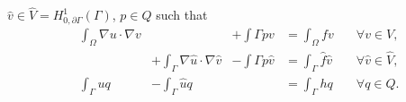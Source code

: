 \documentclass[r]{siamart171218}
\begin{document}
$\hat{v}\in\hat{V}=H^1_{0, \partial\Gamma}(\Gamma)$, $p\in Q$ such that
%
\begin{equation}\label{eq:coupled_weak}
  \begin{aligned}
    &\int_{\Omega}\nabla u\cdot \nabla v &\phantom{+\int_{\Gamma}\nabla \hat{u}\cdot \nabla \hat{v}} &+\int{\Gamma}p v &= \int_{\Omega}f v \quad &\forall v\in V,\\
    &\phantom{\int_{\Omega}\nabla u\cdot \nabla v} &+{\int_{\Gamma}\nabla \hat{u}\cdot \nabla \hat{v}} &-\int{\Gamma}p\hat{v} &= \int_{\Gamma}\hat{f}\hat{v} \quad &\forall \hat{v}\in \hat{V},\\
    &\int_{\Gamma}u q &-\int_{\Gamma}\hat{u}q &\phantom{-\int{\Gamma}q\hat{v}} &= \int_{\Gamma}h q \quad &\forall q\in Q.
  \end{aligned}
\end{equation}
%
\end{document}
